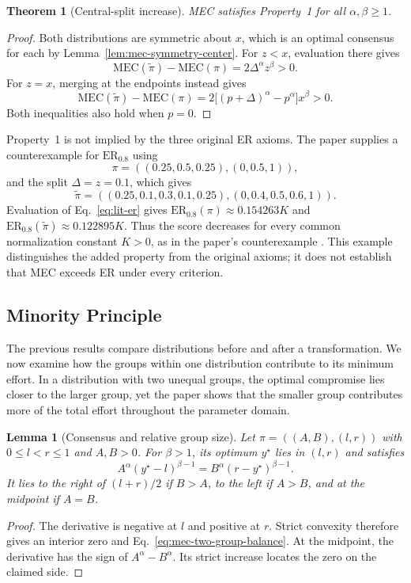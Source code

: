 \documentclass{article}
\theoremstyle{plain}
\newtheorem{theorem}{Theorem}
\newtheorem{lemma}{Lemma}
\theoremstyle{remark}
\begin{document}
\begin{theorem}[Central-split increase]\label{th:mec-central-split}
MEC satisfies Property~1 for all $\alpha,\beta\geq1$.
\end{theorem}
\begin{proof}
Both distributions are symmetric about $x$, which is an optimal consensus for each by Lemma~\ref{lem:mec-symmetry-center}. For $z<x$, evaluation there gives
\[
\mathrm{MEC}(\widetilde\pi)-\mathrm{MEC}(\pi)
=2\Delta^\alpha z^\beta>0.
\]
For $z=x$, merging at the endpoints instead gives
\[
\mathrm{MEC}(\widetilde\pi)-\mathrm{MEC}(\pi)
=2\big[(p+\Delta)^\alpha-p^\alpha\big]x^\beta>0.
\]
Both inequalities also hold when $p=0$.
\end{proof}

Property~1 is not implied by the three original ER axioms. The paper supplies a counterexample for $\mathrm{ER}_{0.8}$ using
\[
\pi=((0.25,0.5,0.25),(0,0.5,1)),
\]
and the split $\Delta=z=0.1$, which gives
\[
\widetilde\pi=((0.25,0.1,0.3,0.1,0.25),(0,0.4,0.5,0.6,1)).
\]
Evaluation of Eq.~\eqref{eq:lit-er} gives $\mathrm{ER}_{0.8}(\pi)\approx0.154263K$ and $\mathrm{ER}_{0.8}(\widetilde\pi)\approx0.122895K$. Thus the score decreases for every common normalization constant $K>0$, as in the paper's counterexample \citep{aranda2026mec}. This example distinguishes the added property from the original axioms; it does not establish that MEC exceeds ER under every criterion.

\subsection{Minority Principle}\label{subsec:mec-minority}

The previous results compare distributions before and after a transformation. We now examine how the groups within one distribution contribute to its minimum effort. In a distribution with two unequal groups, the optimal compromise lies closer to the larger group, yet the paper shows that the smaller group contributes more of the total effort throughout the parameter domain.

\begin{lemma}[Consensus and relative group size]\label{lem:mec-two-group-consensus}
Let $\pi=((A,B),(l,r))$ with $0\leq l<r\leq1$ and $A,B>0$. For $\beta>1$, its optimum $y^\star$ lies in $(l,r)$ and satisfies
\begin{equation}\label{eq:mec-two-group-balance}
A^\alpha(y^\star-l)^{\beta-1}
=B^\alpha(r-y^\star)^{\beta-1}.
\end{equation}
It lies to the right of $(l+r)/2$ if $B>A$, to the left if $A>B$, and at the midpoint if $A=B$.
\end{lemma}
\begin{proof}
The derivative is negative at $l$ and positive at $r$. Strict convexity therefore gives an interior zero and Eq.~\eqref{eq:mec-two-group-balance}. At the midpoint, the derivative has the sign of $A^\alpha-B^\alpha$. Its strict increase locates the zero on the claimed side.
\end{proof}
\end{document}
